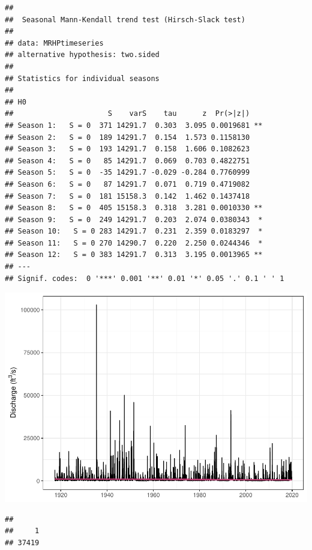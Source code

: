 \documentclass[12pt,]{article}
\begin{document}
\begin{verbatim}
## 
##  Seasonal Mann-Kendall trend test (Hirsch-Slack test)
## 
## data: MRHPtimeseries
## alternative hypothesis: two.sided
## 
## Statistics for individual seasons
## 
## H0
##                      S    varS    tau      z  Pr(>|z|)   
## Season 1:   S = 0  371 14291.7  0.303  3.095 0.0019681 **
## Season 2:   S = 0  189 14291.7  0.154  1.573 0.1158130   
## Season 3:   S = 0  193 14291.7  0.158  1.606 0.1082623   
## Season 4:   S = 0   85 14291.7  0.069  0.703 0.4822751   
## Season 5:   S = 0  -35 14291.7 -0.029 -0.284 0.7760999   
## Season 6:   S = 0   87 14291.7  0.071  0.719 0.4719082   
## Season 7:   S = 0  181 15158.3  0.142  1.462 0.1437418   
## Season 8:   S = 0  405 15158.3  0.318  3.281 0.0010330 **
## Season 9:   S = 0  249 14291.7  0.203  2.074 0.0380343  *
## Season 10:   S = 0 283 14291.7  0.231  2.359 0.0183297  *
## Season 11:   S = 0 270 14290.7  0.220  2.250 0.0244346  *
## Season 12:   S = 0 383 14291.7  0.313  3.195 0.0013965 **
## ---
## Signif. codes:  0 '***' 0.001 '**' 0.01 '*' 0.05 '.' 0.1 ' ' 1
\end{verbatim}

\includegraphics{Project_Template_files/figure-latex/unnamed-chunk-6-19.pdf}

\begin{verbatim}
## 
##     1 
## 37419
\end{verbatim}
\end{document}
